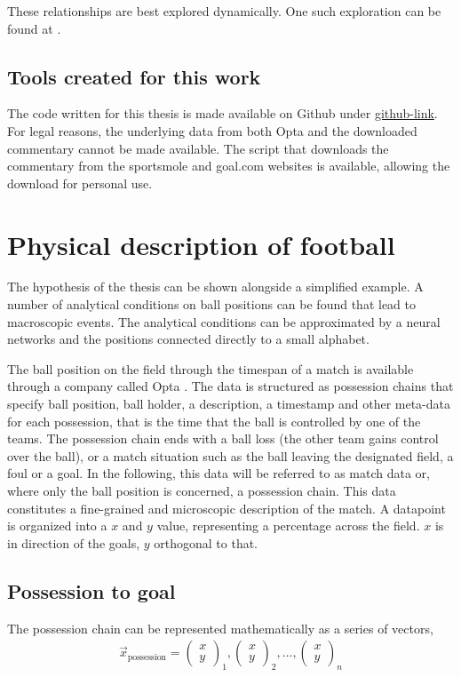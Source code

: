 \documentclass[10pt, a4paper]{UUThesisTemplate}
\begin{document}
These relationships are best explored dynamically. One such exploration can be found at \cite{tensorflowplayground}.

\section{Tools created for this work}

The code written for this thesis is made available on Github under \url{github-link}. For legal reasons, the underlying data from both Opta and the downloaded commentary cannot be made available. The script that downloads the commentary from the sportsmole and goal.com websites is available, allowing the download for personal use.


\chapter{Physical description of football}\label{cha:simplexample}

The hypothesis of the thesis can be shown alongside a simplified example. A number of analytical conditions on ball positions can be found that lead to macroscopic events. The analytical conditions can be approximated by a neural networks and the positions connected directly to a small alphabet.

The ball position on the field through the timespan of a match is available through a company called Opta \cite{Opta}. The data is structured as possession chains that specify ball position, ball holder, a description, a timestamp and other meta-data for each possession, that is the time that the ball is controlled by one of the teams. The possession chain ends with a ball loss (the other team gains control over the ball), or a match situation such as the ball leaving the designated field, a foul or a goal. In the following, this data will be referred to as match data or, where only the ball position is concerned, a possession chain. This data constitutes a fine-grained and microscopic description of the match. A datapoint is organized into a $x$ and $y$ value, representing a percentage across the field. $x$ is in direction of the goals, $y$ orthogonal to that.

\section{Possession to goal}

The possession chain can be represented mathematically as a series of vectors,
\begin{align}
\vec{x}_\text{possession} = \begin{pmatrix}x\\y\end{pmatrix}_1, \begin{pmatrix}x\\y\end{pmatrix}_2, \ldots, \begin{pmatrix}x\\y\end{pmatrix}_n
\end{align}
\end{document}
